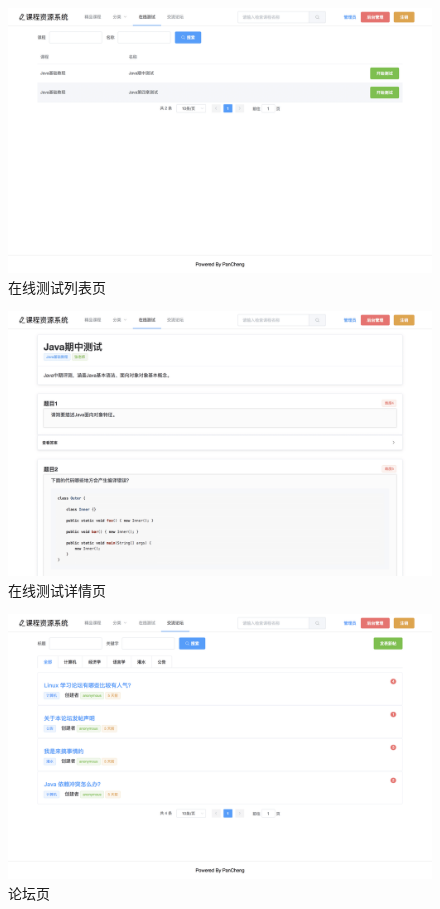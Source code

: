\documentclass[titlepage,UTF8,linespread=1.5]{ctexart}
\begin{document}
\begin{figure}[H]
    \centering
    \includegraphics[width=140mm]{view-exam-list.png}
    \caption{在线测试列表页}
    \label{fig:view-exam-list}
\end{figure}
\begin{figure}[H]
    \centering
    \includegraphics[width=140mm]{view-exam.png}
    \caption{在线测试详情页}
    \label{fig:view-exam}
\end{figure}
\begin{figure}[H]
    \centering
    \includegraphics[width=140mm]{view-forum.png}
    \caption{论坛页}
    \label{fig:view-forum}
\end{figure}
\end{document}
